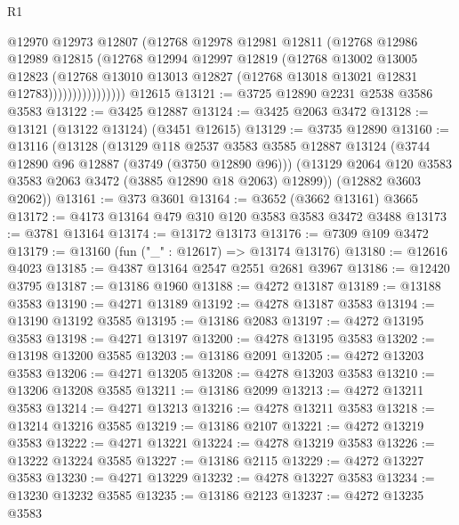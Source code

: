 \begin{lexlean}{R1}
\begin{coremodule}
                        @12970
                        @12973
                        @12807
                        (@12768
                          @12978
                          @12981
                          @12811
                          (@12768
                            @12986
                            @12989
                            @12815
                            (@12768
                              @12994
                              @12997
                              @12819
                              (@12768
                                @13002
                                @13005
                                @12823
                                (@12768
                                  @13010
                                  @13013
                                  @12827
                                  (@12768 @13018 @13021 @12831 @12783))))))))))))))))
    @12615
@13121 := @3725 @12890 @2231 @2538 @3586 @3583
@13122 := @3425 @12887
@13124 := @3425 @2063 @3472
@13128 := @13121 (@13122 @13124) (@3451 @12615)
@13129 := @3735 @12890
@13160 := @13116
    (@13128
      (@13129
        @118
        @2537
        @3583
        @3585
        @12887
        @13124
        (@3744 @12890 @96 @12887 (@3749 (@3750 @12890 @96)))
        (@13129 @2064 @120 @3583 @3583 @2063 @3472 (@3885 @12890 @18 @2063) @12899))
      (@12882 @3603 @2062))
@13161 := @373 @3601
@13164 := @3652 (@3662 @13161) @3665
@13172 := @4173 @13164 @479 @310 @120 @3583 @3583 @3472 @3488
@13173 := @3781 @13164
@13174 := @13172 @13173
@13176 := @7309 @109 @3472
@13179 := @13160 (fun ("_" : @12617) => @13174 @13176)
@13180 := @12616 @4023
@13185 := @4387 @13164 @2547 @2551 @2681 @3967
@13186 := @12420 @3795
@13187 := @13186 @1960
@13188 := @4272 @13187
@13189 := @13188 @3583
@13190 := @4271 @13189
@13192 := @4278 @13187 @3583
@13194 := @13190 @13192 @3585
@13195 := @13186 @2083
@13197 := @4272 @13195 @3583
@13198 := @4271 @13197
@13200 := @4278 @13195 @3583
@13202 := @13198 @13200 @3585
@13203 := @13186 @2091
@13205 := @4272 @13203 @3583
@13206 := @4271 @13205
@13208 := @4278 @13203 @3583
@13210 := @13206 @13208 @3585
@13211 := @13186 @2099
@13213 := @4272 @13211 @3583
@13214 := @4271 @13213
@13216 := @4278 @13211 @3583
@13218 := @13214 @13216 @3585
@13219 := @13186 @2107
@13221 := @4272 @13219 @3583
@13222 := @4271 @13221
@13224 := @4278 @13219 @3583
@13226 := @13222 @13224 @3585
@13227 := @13186 @2115
@13229 := @4272 @13227 @3583
@13230 := @4271 @13229
@13232 := @4278 @13227 @3583
@13234 := @13230 @13232 @3585
@13235 := @13186 @2123
@13237 := @4272 @13235 @3583

\end{coremodule}
\end{lexlean}
